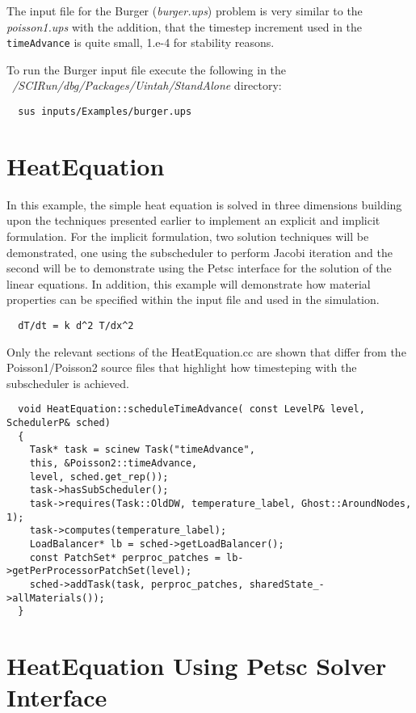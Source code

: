 \documentclass[11pt,fleqn]{book} %
\begin{document}
The input file for the Burger (\emph{burger.ups}) problem is very
similar to the \emph{poisson1.ups} with the addition, that the
timestep increment used in the \texttt{timeAdvance} is quite small,
1.e-4 for stability reasons.

To run the Burger input file execute the following in the
\emph{~/SCIRun/dbg/Packages/Uintah/StandAlone} directory:

\begin{lstlisting}
  sus inputs/Examples/burger.ups
\end{lstlisting}

\section{HeatEquation}

In this example, the simple heat equation is solved in three
dimensions building upon the techniques presented earlier to implement
an explicit and implicit formulation.  For the implicit formulation,
two solution techniques will be demonstrated, one using the
subscheduler to perform Jacobi iteration and the second will be to
demonstrate using the Petsc interface for the solution of the linear
equations.  In addition, this example will demonstrate how material
properties can be specified within the input file and used in the
simulation.

\begin{lstlisting}
  dT/dt = k d^2 T/dx^2  
\end{lstlisting}

Only the relevant sections of the HeatEquation.cc are shown that
differ from the Poisson1/Poisson2 source files that highlight how
timesteping with the subscheduler is achieved.

\begin{lstlisting}
  void HeatEquation::scheduleTimeAdvance( const LevelP& level, SchedulerP& sched)
  {
    Task* task = scinew Task("timeAdvance",
    this, &Poisson2::timeAdvance,
    level, sched.get_rep());
    task->hasSubScheduler();
    task->requires(Task::OldDW, temperature_label, Ghost::AroundNodes, 1);
    task->computes(temperature_label);
    LoadBalancer* lb = sched->getLoadBalancer();
    const PatchSet* perproc_patches = lb->getPerProcessorPatchSet(level);
    sched->addTask(task, perproc_patches, sharedState_->allMaterials());
  }

\end{lstlisting}

\section{HeatEquation Using Petsc Solver Interface}
\end{document}
